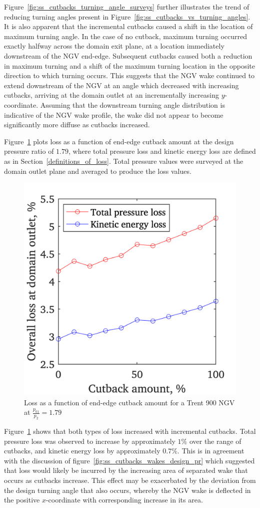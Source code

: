 \documentclass[a4paper, 11pt, oneside]{report}
\begin{document}
\newpage
Figure~\ref{fig:ss_cutbacks_turning_angle_surveys} further illustrates the trend of reducing turning angles present in Figure~\ref{fig:ss_cutbacks_vs_turning_angles}. It is also apparent that the incremental cutbacks caused a shift in the location of maximum turning angle. In the case of no cutback, maximum turning occurred exactly halfway across the domain exit plane, at a location immediately downstream of the NGV end-edge. Subsequent cutbacks caused both a reduction in maximum turning and a shift of the maximum turning location in the opposite direction to which turning occurs. This suggests that the NGV wake continued to extend downstream of the NGV at an angle which decreased with increasing cutbacks, arriving at the domain outlet at an incrementally increasing $y$-coordinate. Assuming that the downstream turning angle distribution is indicative of the NGV wake profile, the wake did not appear to become significantly more diffuse as cutbacks increased.

Figure~\ref{fig:ss_cutbacks_vs_losses} plots loss as a function of end-edge cutback amount at the design pressure ratio of $1.79$, where total pressure loss and kinetic energy loss are defined as in Section~\ref{definitions_of_loss}. Total pressure values were surveyed at the domain outlet plane and averaged to produce the loss values.

\begin{figure}[H]
	\centering
	\includegraphics[width=.45\textwidth]{figs/ss_cutbacks_vs_losses.png}
	\caption{Loss as a function of end-edge cutback amount for a Trent 900 NGV at $\frac{p_{01}}{p_2}=1.79$}
    \label{fig:ss_cutbacks_vs_losses}
\end{figure}

Figure~\ref{fig:ss_cutbacks_vs_losses} shows that both types of loss increased with incremental cutbacks. Total pressure loss was observed to increase by approximately $1\%$ over the range of cutbacks, and kinetic energy loss by approximately $0.7\%$. This is in agreement with the discussion of figure~\ref{fig:ss_cutbacks_wakes_design_pr} which suggested that loss would likely be incurred by the increasing area of separated wake that occurs as cutbacks increase. This effect may be exacerbated by the deviation from the design turning angle that also occurs, whereby the NGV wake is deflected in the positive $x$-coordinate with corresponding increase in its area.
\end{document}
